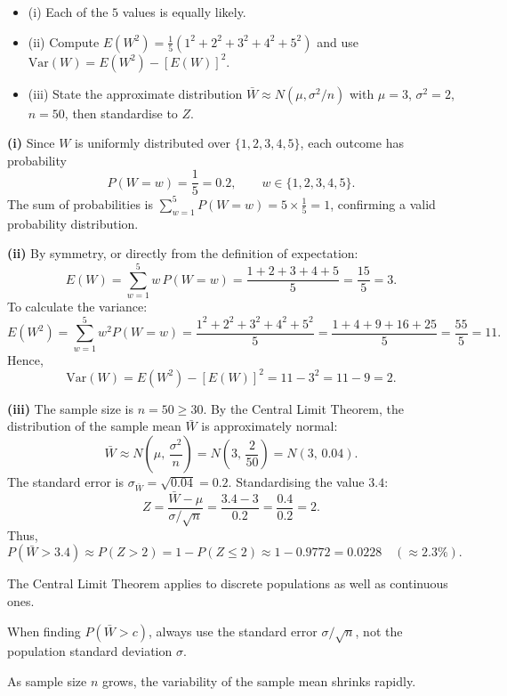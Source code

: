 \begin{hint}
\begin{itemize}[leftmargin=*]
  \item (i) Each of the $5$ values is equally likely.
  \item (ii) Compute $E(W^2) = \frac{1}{5}(1^2 + 2^2 + 3^2 + 4^2 + 5^2)$ and use $\mathrm{Var}(W) = E(W^2) - [E(W)]^2$.
  \item (iii) State the approximate distribution $\bar{W} \approx N(\mu, \sigma^2/n)$ with $\mu=3$, $\sigma^2=2$, $n=50$, then standardise to $Z$.
\end{itemize}
\end{hint}

\begin{solution}
\textbf{(i)} Since $W$ is uniformly distributed over $\{1, 2, 3, 4, 5\}$, each outcome has probability
\[
P(W=w) = \frac{1}{5} = 0{.}2, \qquad w \in \{1, 2, 3, 4, 5\}.
\]
The sum of probabilities is $\sum_{w=1}^5 P(W=w) = 5 \times \frac{1}{5} = 1$, confirming a valid probability distribution.

\textbf{(ii)} By symmetry, or directly from the definition of expectation:
\[
E(W) = \sum_{w=1}^5 w\,P(W=w) = \frac{1+2+3+4+5}{5} = \frac{15}{5} = 3.
\]
To calculate the variance:
\[
E(W^2) = \sum_{w=1}^5 w^2 P(W=w) = \frac{1^2 + 2^2 + 3^2 + 4^2 + 5^2}{5} = \frac{1 + 4 + 9 + 16 + 25}{5} = \frac{55}{5} = 11.
\]
Hence,
\[
\mathrm{Var}(W) = E(W^2) - [E(W)]^2 = 11 - 3^2 = 11 - 9 = \boxed{2}.
\]

\textbf{(iii)} The sample size is $n = 50 \geq 30$. By the Central Limit Theorem, the distribution of the sample mean $\bar{W}$ is approximately normal:
\[
\bar{W} \approx N\!\left(\mu,\, \frac{\sigma^2}{n}\right) = N\!\left(3,\, \frac{2}{50}\right) = N(3,\, 0{.}04).
\]
The standard error is $\sigma_{\bar{W}} = \sqrt{0{.}04} = 0{.}2$.
Standardising the value $3{.}4$:
\[
Z = \frac{\bar{W} - \mu}{\sigma / \sqrt{n}} = \frac{3{.}4 - 3}{0{.}2} = \frac{0{.}4}{0{.}2} = 2.
\]
Thus,
\[
P(\bar{W} > 3{.}4) \approx P(Z > 2) = 1 - P(Z \leq 2) \approx 1 - 0{.}9772 = \boxed{0{.}0228} \quad (\approx 2{.}3\%).
\]
\end{solution}

\begin{takeaways}
\item The Central Limit Theorem applies to discrete populations as well as continuous ones.
\item When finding $P(\bar{W} > c)$, always use the standard error $\sigma / \sqrt{n}$, not the population standard deviation $\sigma$.
\item As sample size $n$ grows, the variability of the sample mean shrinks rapidly.
\end{takeaways}
